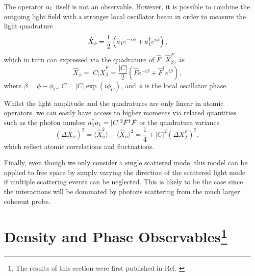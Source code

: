The operator $a_1$ itself is not an observable. However, it is
possible to combine the outgoing light field with a stronger local
oscillator beam in order to measure the light quadrature
\begin{equation}
  \hat{X}_\phi = \frac{1}{2} \left( a_1 e^{-i \phi} + a^\dagger_1 e^{i \phi} \right),
\end{equation}
which in turn can expressed via the quadrature of $\hat{F}$,
$\hat{X}^F_\beta$, as
\begin{equation}
  \hat{X}_\phi = |C| \hat{X}_\beta^F = \frac{|C|}{2} \left( \hat{F}
    e^{-i \beta} + \hat{F}^\dagger e^{i \beta} \right),
\end{equation}
where $\beta = \phi - \phi_C$, $C = |C| \exp(i \phi_C)$, and $\phi$ is
the local oscillator phase.

Whilst the light amplitude and the quadratures are only linear in
atomic operators, we can easily have access to higher moments via
related quantities such as the photon number
$a^\dagger_1 a_1 = |C|^2 \hat{F}^\dagger \hat{F}$ or the quadrature
variance
\begin{equation}
  \label{eq:Xvar}
  ( \Delta X_\phi )^2 = \langle \hat{X}_\phi^2 \rangle - \langle
  \hat{X}_\phi \rangle^2 = \frac{1}{4} + |C|^2 (\Delta X^F_\beta)^2,
\end{equation}
which reflect atomic correlations and fluctuations.

Finally, even though we only consider a single scattered mode, this
model can be applied to free space by simply varying the direction of
the scattered light mode if multiple scattering events can be
neglected. This is likely to be the case since the interactions will
be dominated by photons scattering from the much larger coherent
probe.

\section[Density and Phase Observables]
        {Density and Phase Observables\footnote{The results of this
            section were first published in Ref. \cite{kozlowski2015}}}
\label{sec:B}

